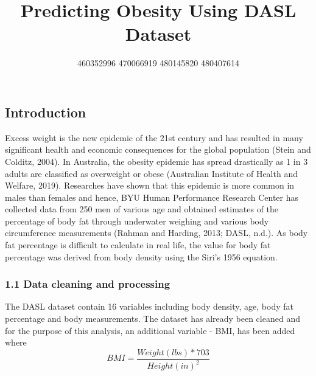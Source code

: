 \documentclass[a4paper,9pt,twocolumn,twoside,]{pinp}
\title{Predicting Obesity Using DASL Dataset}
\author[]{460352996 470066919 480145820 480407614}
\affil[]{GitHub code repository is
\href{https://github.sydney.edu.au/awon6941/DATA2002-M4.git}{here}}
\begin{document}
\verticaladjustment{-2pt}

\maketitle
\thispagestyle{firststyle}



\hypertarget{introduction}{%
\subsection{Introduction}\label{introduction}}

Excess weight is the new epidemic of the 21st century and has resulted
in many significant health and economic consequences for the global
population (Stein and Colditz, 2004). In Australia, the obesity epidemic
has spread drastically as 1 in 3 adults are classified as overweight or
obese (Australian Institute of Health and Welfare, 2019). Researches
have shown that this epidemic is more common in males than females and
hence, BYU Human Performance Research Center has collected data from 250
men of various age and obtained estimates of the percentage of body fat
through underwater weighing and various body circumference measurements
(Rahman and Harding, 2013; DASL, n.d.). As body fat percentage is
difficult to calculate in real life, the value for body fat percentage
was derived from body density using the Siri's 1956 equation.

\hypertarget{data-cleaning-and-processing}{%
\subsubsection{1.1 Data cleaning and
processing}\label{data-cleaning-and-processing}}

The DASL dataset contain 16 variables including body density, age, body
fat percentage and body measurements. The dataset has already been
cleaned and for the purpose of this analysis, an additional variable -
BMI, has been added where
\[ BMI = \frac{Weight (lbs)*703}{Height(in)^2} \]
\end{document}
